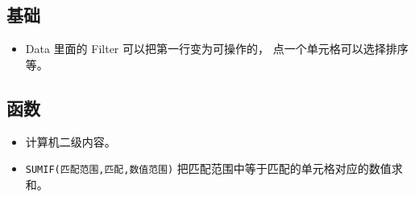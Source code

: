 
\begin{issues}
\issueDraft
\end{issues}

\subsection{基础}
\begin{itemize}
\item Data 里面的 Filter 可以把第一行变为可操作的， 点一个单元格可以选择排序等。
\end{itemize}

\subsection{函数}
\begin{itemize}
\item 计算机二级内容。
\item \verb|SUMIF(匹配范围,匹配,数值范围)| 把匹配范围中等于匹配的单元格对应的数值求和。
\end{itemize}
